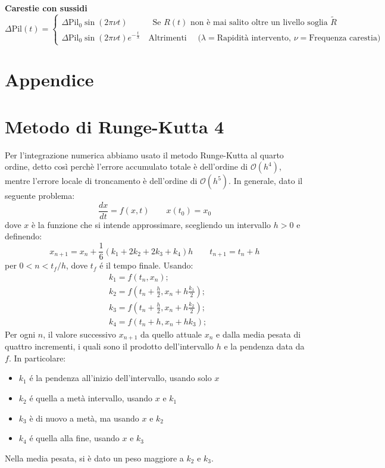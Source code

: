 \textbf{Carestie con sussidi}
\begin{equation}
	\Delta\text{Pil}(t)=
	\begin{cases}
		\Delta\text{Pil}_0\sin(2\pi\nu t) \qquad \quad \text{Se $R(t)$ non è mai salito oltre un livello soglia $\tilde{R}$}\\
		\Delta\text{Pil}_0\sin(2\pi\nu t)e^{-\frac{t}{\lambda}} \quad \text{Altrimenti}\quad     \text{ ($\lambda=$Rapidità intervento, $\nu=$Frequenza carestia)}
	\end{cases}
\end{equation}

\newpage
\appendix
\section*{Appendice}
\section{Metodo di Runge-Kutta 4}
Per l'integrazione numerica abbiamo usato il metodo Runge-Kutta al quarto ordine, detto così perchè l'errore accumulato totale è dell'ordine di $ \mathcal{O}(h^{4}) $, mentre l'errore locale di troncamento è dell'ordine di $ \mathcal{O}(h^{5}) $. 
In generale, dato il seguente problema:
\begin{equation} \tag{A1}
\frac{dx}{dt}=f(x,t)\qquad x(t_{0})=x_{0}
\end{equation}
dove $ x $ è la funzione che si intende approssimare, scegliendo un intervallo $ h>0 $ e definendo:
\begin{equation} \tag{A2}
	x_{n+1}=x_{n}+\frac{1}{6}(k_{1}+2k_{2}+2k_{3}+k_{4})h \qquad t_{n+1}=t_{n}+h
\end{equation}
per $ 0<n<t_{f}/h $, dove $ t_{f} $ é il tempo finale. Usando:
\begin{equation} \tag{A3}
	\begin{aligned}
	&k_{1}=f(t_{n}, x_{n});\\
	&k_{2}=f(t_{n}+\frac{h}{2}, x_{n}+h\frac{k_{1}}{2});\\
	&k_{3}=f(t_{n}+\frac{h}{2}, x_{n}+h\frac{k_{2}}{2});\\
	&k_{4}=f(t_{n}+h, x_{n}+hk_{3});
\end{aligned}
\end{equation}
Per ogni $ n $, il valore successivo $ x_{n+1} $ da quello attuale $ x_{n} $ e dalla media pesata di quattro incrementi, i quali sono il prodotto dell'intervallo $ h $ e la pendenza data da $ f $. In particolare:
\begin{itemize}
	\item $ k_{1} $ é la pendenza all'inizio dell'intervallo, usando solo $ x $ 
	\item $ k_{2} $ é quella a metà intervallo, usando $ x $ e $ k_{1} $
	\item $ k_{3} $ è di nuovo a metà, ma usando $ x $ e $ k_{2} $
	\item $ k_{4} $ é quella alla fine, usando $ x $ e $ k_{3} $
\end{itemize}
Nella media pesata, si è dato un peso maggiore a $ k_{2} $ e $ k_{3} $.